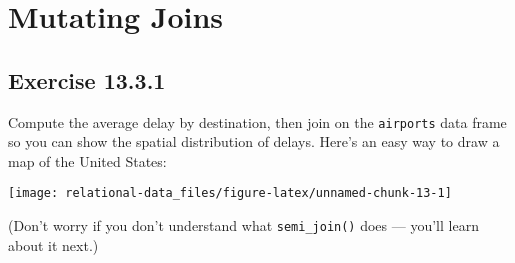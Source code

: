 \documentclass[]{book}
\newenvironment{Shaded}{\begin{snugshade}}{\end{snugshade}}
\newcommand{\CommentTok}[1]{\textcolor[rgb]{0.56,0.35,0.01}{\textit{#1}}}
\newcommand{\KeywordTok}[1]{\textcolor[rgb]{0.13,0.29,0.53}{\textbf{#1}}}
\newcommand{\NormalTok}[1]{#1}
\newcommand{\OperatorTok}[1]{\textcolor[rgb]{0.81,0.36,0.00}{\textbf{#1}}}
\newcommand{\StringTok}[1]{\textcolor[rgb]{0.31,0.60,0.02}{#1}}
\theoremstyle{plain}
\theoremstyle{remark}
\theoremstyle{definition}
\theoremstyle{definition}
\theoremstyle{definition}
\theoremstyle{remark}
\begin{document}
\hypertarget{mutating-joins}{%
\section{Mutating Joins}\label{mutating-joins}}

\begin{Shaded}
\end{Shaded}

\hypertarget{exercise-13.3.1}{%
\subsection*{\texorpdfstring{Exercise
{13.3.1}}{Exercise 13.3.1}}\label{exercise-13.3.1}}

Compute the average delay by destination, then join on the
\texttt{airports} data frame so you can show the spatial distribution of
delays. Here's an easy way to draw a map of the United States:

\begin{Shaded}
\end{Shaded}

\begin{center}\texttt{[image: relational-data\_files/figure-latex/unnamed-chunk-13-1]} \end{center}

(Don't worry if you don't understand what \texttt{semi\_join()} does ---
you'll learn about it next.)
\end{document}

